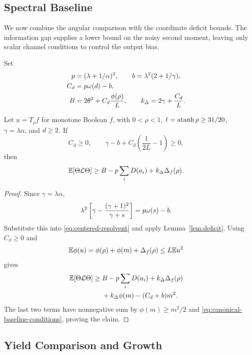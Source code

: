 \subsection{Spectral Baseline}
\label{sec:baseline}

We now combine the angular comparison with the coordinate deficit bounds.
The information gap supplies a lower bound on the noisy second moment,
leaving only scalar channel conditions to control the output bias.

Set
\begin{align*}
 p&=(\lambda+1/\alpha)^2,\qquad
 b=\lambda^2(2+1/\gamma),\\
 C_d&=p\omega(d)-b,\\
 B&=2\theta^2+C_d\frac{\phi(\rho)}L,\qquad
 k_\Delta=2\gamma+\frac{C_d}L.
\end{align*}

\begin{lemma}\label{lem:baseline}
Let \(u=T_\rho f\) for monotone Boolean \(f\), with
\(0<\rho<1\), \(\ell=\operatorname{atanh}\rho\ge31/20\),
\(\gamma=\lambda\alpha\), and \(d\ge2\).
If
\begin{equation}
 C_d\ge0,\qquad
 \gamma-b+C_d\left(\frac1{2L}-1\right)\ge0,
 \label{eq:canonical-baseline-conditions}
\end{equation}
then
\begin{equation}
 \mathbb E[\Theta\mathcal L\Theta]\ge B-p\sum_iD(a_i)
                         +k_\Delta\Delta_f(\rho).
 \label{eq:baseline}
\end{equation}
\end{lemma}

\begin{proof}
Since \(\gamma=\lambda\alpha\),
\[
 \lambda^2\left[\gamma-\frac{(\gamma+1)^2}{\gamma+s}\right]
 =p\omega(s)-b.
\]
Substitute this into \eqref{eq:centered-resolvent} and apply
Lemma~\ref{lem:deficit}. Using \(C_d\ge0\) and
\[
 \mathbb E\phi(u)=\phi(\rho)+\phi(m)+\Delta_f(\rho)\le L\mathbb E u^2
\]
gives
\[
 \begin{aligned}
 \mathbb E[\Theta\mathcal L\Theta]\ge{}&
 B-p\sum_iD(a_i)+k_\Delta\Delta_f(\rho)\\
 &+k_\Delta\phi(m)-(C_d+b)m^2.
 \end{aligned}
\]
The last two terms have nonnegative sum by
\(\phi(m)\ge m^2/2\) and
\eqref{eq:canonical-baseline-conditions}, proving the claim.
\end{proof}

\subsection{Yield Comparison and Growth}
\label{sec:contradiction}

